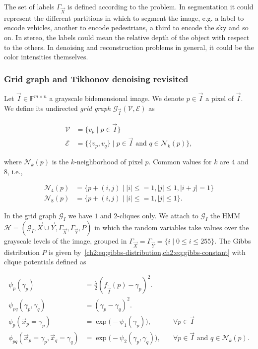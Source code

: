 The set of labels $\Gamma_{\vec{X}}$ is defined according to the problem. In segmentation it could represent the different partitions in which to segment the image, e.g. a label to encode vehicles, another to encode pedestrians, a third to encode the sky and so on. In stereo, the labels could mean the relative depth of the object with respect to the others. In denoising and reconstruction problems in general, it could be the color intensities themselves. 

\subsubsection{Grid graph and Tikhonov denoising revisited}
Let $\vec{I} \in \mathbb{F}^{m \times n}$ a grayscale bidemensional image. We denote $p \in \vec{I}$ a pixel of $\vec{I}$.  We define its undirected \emph{grid graph} $\mathcal{G}_{\vec{I}}(\mathcal{V},\mathcal{E})$ as

\begin{align*}
	\mathcal{V} &= \{ v_p \; | \; p \in \vec{I} \} \\
	\mathcal{E} &= \big\{ \{v_p,v_q\} \; | \; p \in \vec{I} \text{ and } q \in \mathcal{N}_k(p) \big\},
\end{align*}

where $\mathcal{N}_k(p)$ is the $k$-neighborhood of pixel $p$. Common values for $k$ are $4$ and $8$, i.e., 

\begin{align*}
	\mathcal{N}_4(p) &= \{ p + (i,j) \; | \; |i| \leq=1, |j| \leq 1, |i+j|=1 \}\\
	\mathcal{N}_8(p) &= \{ p + (i,j) \; | \; |i| \leq=1, |j| \leq 1 \}.
\end{align*}

In the grid graph $\mathcal{G}_I$ we have $1$ and $2$-cliques only. We attach to $\mathcal{G}_I$ the HMM $\mathcal{H} = (\mathcal{G}_I,\vec{X} \cup \vec{Y},\Gamma_{\vec{X}},\Gamma_{\vec{Y}},P)$ in which the random variables take values over the grayscale levels of the image, grouped in $\Gamma_{\vec{X}} = \Gamma_{\vec{Y}} = \{i \; | \; 0 \leq i \leq 255 \}$. The Gibbs distribution $P$ is given by~\cref{ch2:eq:gibbs-distribution,ch2:eq:gibbs-constant} with clique potentials defined as

\begin{equation*}
	\begin{array}{rll}
	\psi_{p}(\gamma_p) &=  \frac{\lambda}{2} \left( f_{\widetilde{\vec{I}}}(p) - \gamma _p \right) ^2. & \\
	\psi_{pq}(\gamma_p, \gamma_q) &= ( \gamma _p - \gamma _q )^2. &\\[1em]
	\phi_p(\vec{x}_p=\gamma _p) &= \exp\big( - \psi_1(\gamma_p) \big),& \quad \forall p \in \vec{I} \\
	\phi_{pq}(\vec{x}_p=\gamma_p, \vec{x}_q=\gamma _q) &= \exp\big( - \psi_{2}(\gamma_p,\gamma_q) \big),& \quad \forall p \in \vec{I} \text{ and }  q \in \mathcal{N}_k(p). \\
	\end{array}
\end{equation*}

